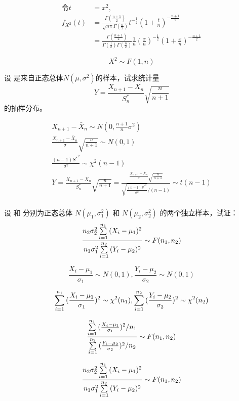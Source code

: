   \[
    \begin{split}
    \text{令} t&=x^2,\\
    f_{X^2} (t) &= \frac{\Gamma (\frac{n+1}{2})}{\sqrt{n\pi} \Gamma (\frac{n}{2})} t^{-\frac{1}{2}} (1+\frac{t}{n})^{-\frac{n+1}{2}}\\
    &= \frac{\Gamma (\frac{n+1}{2})}{\Gamma (\frac{1}{2}) \Gamma (\frac{n}{2})} \frac{1}{n} (\frac{x}{n})^{-\frac{1}{2}} (1+\frac{x}{n})^{-\frac{n+1}{2}}
  \end{split}
  \]

  $$X^2 \sim F(1, n)$$


   设  是来自正态总体$N(\mu, \sigma^2)$的样本，试求统计量$$Y=\frac{X_{n+1} - X_n}{S_n^*} \sqrt{\frac{n}{n+1}}$$的抽样分布。

  \xsv
  \[
    \begin{split}
      X_{n+1} - \bar{X}_n \sim N(0, \frac{n+1}{n} \sigma^2)\\
      \frac{X_{n+1} - \bar{X}_n}{\sigma} \sqrt{\frac{n}{n+1}} \sim N(0, 1)\\
      \frac{(n-1) {S^{*}}^2}{\sigma^2} \sim \chi^2 (n-1)\\
      Y=\frac{X_{n+1} - X_n}{S_n^*} \sqrt{\frac{n}{n+1}} = \frac{\frac{X_{n+1}-\bar{X}_n}{\sigma} \sqrt{\frac{n}{n+1}}}{\sqrt{\frac{(n-1){S^*}^2}{\sigma^2}}/(n-1)} \sim t(n-1)\\
    \end{split}
  \]


   设  和  分别为正态总体 $N(\mu_1, \sigma_1^2)$ 和 $N(\mu_2, \sigma_2^2)$ 的两个独立样本，试证：$$\frac{n_2 \sigma_2^2 \sum\limits_{i=1}^{n_1}{(X_i-\mu_1)^2}}{n_1 \sigma_1^2 \sum\limits_{i=1}^{n_2}{(Y_i-\mu_2)^2}} \sim F(n_1, n_2)$$

  \xsv
  \[
    \frac{X_i-\mu_1}{\sigma_1} \sim N(0, 1), \frac{Y_i-\mu_2}{\sigma_2} \sim N(0, 1)
  \]

  \[
    \sum\limits_{i=1}^{n_1}{(\frac{X_i-\mu_1}{\sigma_1})^2} \sim \chi^2 (n_1), \sum\limits_{i=1}^{n_2}{(\frac{Y_i-\mu_2}{\sigma_2})^2} \sim \chi^2 (n_2)
  \]

  \[
    \frac{\sum\limits_{i=1}^{n_1}{(\frac{X_i-\mu_1}{\sigma_1})^2} / n_1}{\sum\limits_{i=1}^{n_2}{(\frac{Y_i-\mu_2}{\sigma_2})^2} / n_2} \sim F(n_1, n_2)
  \]

  $$\frac{n_2 \sigma_2^2 \sum\limits_{i=1}^{n_1}{(X_i-\mu_1)^2}}{n_1 \sigma_1^2 \sum\limits_{i=1}^{n_2}{(Y_i-\mu_2)^2}} \sim F(n_1, n_2)$$
